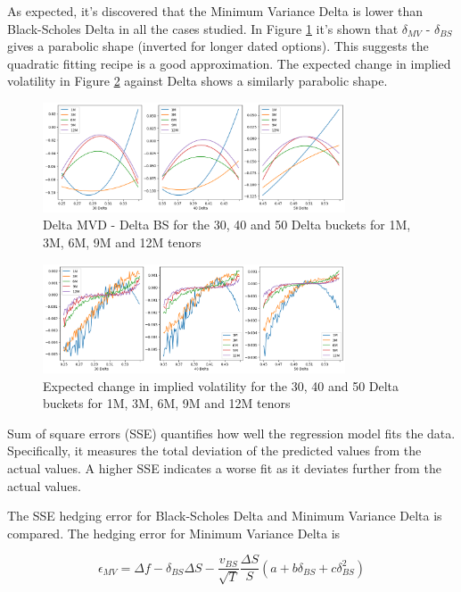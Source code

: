 \documentclass{article}
\newcommand{\para}{\vspace{8pt}} %
\begin{document}
As expected, it's discovered that the Minimum Variance Delta is lower than Black-Scholes Delta in all the cases studied. In Figure \ref{fig:mvd-bs} it's shown that
$\delta_{MV}$ - $\delta_{BS}$ gives a parabolic shape (inverted for longer dated options). This suggests the quadratic fitting recipe is a good approximation.
The expected change in implied volatility in Figure \ref{fig:eiv} against Delta shows a similarly parabolic shape.

\begin{figure}[h]
    \centering
    \includegraphics[width=0.8\textwidth]{images/mvd-bs.png}
    \caption{Delta MVD - Delta BS for the 30, 40 and 50 Delta buckets for 1M, 3M, 6M, 9M and 12M tenors}
    \label{fig:mvd-bs}
\end{figure}


\begin{figure}[h]
    \centering
    \includegraphics[width=0.8\textwidth]{images/eiv.png}
    \caption{Expected change in implied volatility for the 30, 40 and 50 Delta buckets for 1M, 3M, 6M, 9M and 12M tenors}
    \label{fig:eiv}
\end{figure}


Sum of square errors (SSE) quantifies how well the regression model fits the data. 
Specifically, it measures the total deviation of the predicted values from the actual values. A higher SSE indicates a worse fit as it
deviates further from the actual values. 

\para
The SSE hedging error for Black-Scholes Delta and Minimum Variance Delta is compared. The hedging
error for Minimum Variance Delta is 

\[
\epsilon_{MV} = \Delta f - \delta_{BS} \Delta S - \frac{v_{BS}}{\sqrt{T}} \frac{\Delta S}{S} (a + b \delta_{BS} + c \delta_{BS}^2)
\]
\end{document}
